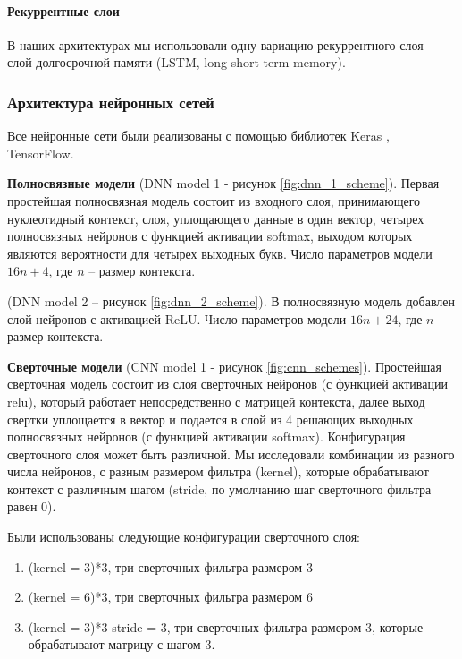 \paragraph{Рекуррентные слои} В наших архитектурах мы использовали одну вариацию рекуррентного слоя -- слой долгосрочной памяти (LSTM, long short-term memory). 
  
\subsubsection{Архитектура нейронных сетей}
Все нейронные сети были реализованы с помощью библиотек Keras\cite{chollet_keras_2015} , TensorFlow.



{\bfseries Полносвязные модели} (DNN model 1 - рисунок \ref{fig:dnn_1_scheme}). Первая простейшая полносвязная модель состоит из входного слоя, принимающего нуклеотидный контекст, слоя, уплощающего данные в один вектор, четырех полносвязных нейронов с функцией активации softmax, выходом которых являются вероятности для четырех выходных букв. Число параметров модели $16n + 4$, где $n$ -- размер контекста.

(DNN model 2 -- рисунок \ref{fig:dnn_2_scheme}). В полносвязную модель добавлен слой нейронов с активацией ReLU. Число параметров модели $16n + 24$, где $n$ -- размер контекста.


{\bfseries Сверточные модели} (CNN model 1 - рисунок \ref{fig:cnn_schemes}).
Простейшая сверточная модель состоит из слоя сверточных нейронов (с функцией активации relu), который работает непосредственно с матрицей контекста, далее выход свертки уплощается в вектор и подается в слой из 4 решающих выходных полносвязных нейронов (с функцией активации softmax). Конфигурация сверточного слоя может быть различной. Мы исследовали комбинации из разного числа нейронов, с разным размером фильтра (kernel), которые обрабатывают контекст с различным шагом (stride, по умолчанию шаг сверточного фильтра равен 0).

Были использованы следующие конфигурации сверточного слоя: \begin{enumerate}
		\item (kernel = 3)*3, три сверточных фильтра размером 3
		\item (kernel = 6)*3, три сверточных фильтра размером 6
		\item (kernel = 3)*3 stride = 3, три сверточных фильтра размером 3, которые обрабатывают матрицу с шагом 3.
	\end{enumerate}
 
